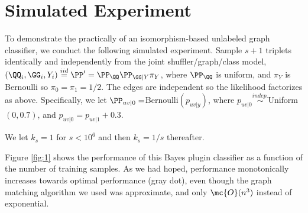 \documentclass[10pt,journal,cspaper,compsoc]{IEEEtran}
\begin{document}





\section{Simulated Experiment} %
\label{sec:simulated_experiment}

To demonstrate the practically of an isomorphism-based unlabeled graph classifier, we conduct the following simulated experiment. Sample $s+1$ triplets identically and independently from the joint shuffler/graph/class model, $(\QQ_i,\GG_i,Y_i)\overset{iid}{=}\PP'=\PP_{\QQ}\PP_{\GG|Y} \pi_Y$, where $\PP_{\QQ}$ is uniform, and $\pi_Y$ is Bernoulli so $\pi_0=\pi_1=1/2$.  The edges are independent so the likelihood factorizes as above.  Specifically, we let $\PP_{uv|0}=$Bernoulli$(p_{uv|y})$, where $p_{uv|0} \overset{indep.}{\sim}$Uniform$(0,0.7)$, and $p_{uv|0}=p_{uv|1}+0.3$.  

We let $k_s=1$ for $s<10^6$ and then $k_s=1/s$ thereafter.



Figure \ref{fig:1} shows the performance of this Bayes plugin classifier as a function of the number of training samples.  As we had hoped, performance monotonically increases towards optimal performance (gray dot), even though the graph matching algorithm we used was approximate, and only $\mc{O}(n^3)$ instead of exponential.
\end{document}
